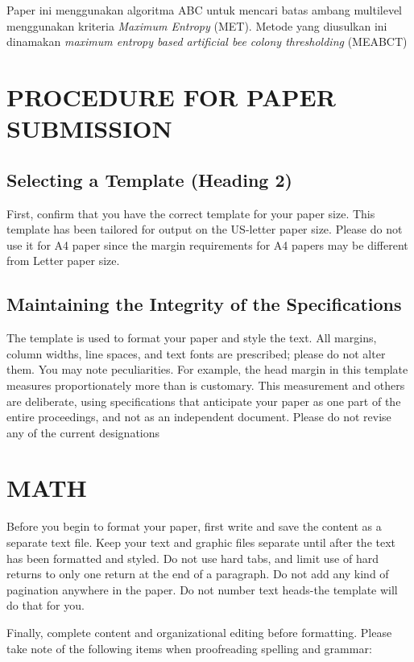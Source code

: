 \documentclass[a4paper, 10pt, conference]{ieeeconf}
\begin{document}
Paper ini menggunakan algoritma ABC untuk mencari batas ambang multilevel menggunakan kriteria \textit{Maximum Entropy} (MET). Metode yang diusulkan ini dinamakan \textit{maximum entropy based artificial bee colony thresholding }(MEABCT) 

\section{PROCEDURE FOR PAPER SUBMISSION}

\subsection{Selecting a Template (Heading 2)}

First, confirm that you have the correct template for your paper size. This template has been tailored for output on the US-letter paper size. Please do not use it for A4 paper since the margin requirements for A4 papers may be different from Letter paper size.

\subsection{Maintaining the Integrity of the Specifications}

The template is used to format your paper and style the text. All margins, column widths, line spaces, and text fonts are prescribed; please do not alter them. You may note peculiarities. For example, the head margin in this template measures proportionately more than is customary. This measurement and others are deliberate, using specifications that anticipate your paper as one part of the entire proceedings, and not as an independent document. Please do not revise any of the current designations

\section{MATH}

Before you begin to format your paper, first write and save the content as a separate text file. Keep your text and graphic files separate until after the text has been formatted and styled. Do not use hard tabs, and limit use of hard returns to only one return at the end of a paragraph. Do not add any kind of pagination anywhere in the paper. Do not number text heads-the template will do that for you.

Finally, complete content and organizational editing before formatting. Please take note of the following items when proofreading spelling and grammar:
\end{document}
